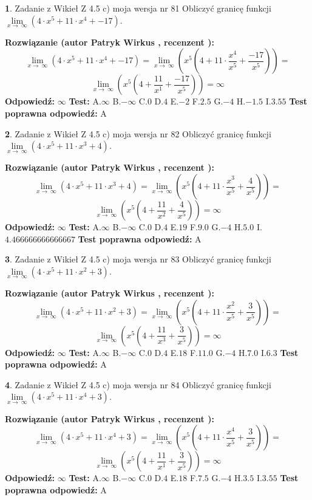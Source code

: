 \documentclass[12pt, a4paper]{article}
\theoremstyle{definition} %
\newtheorem{zad}{}
\newcommand{\zadStart}[1]{\begin{zad}#1\newline}
\newcommand{\zadStop}{\end{zad}}
\newcommand{\rozwStart}[2]{\noindent \textbf{Rozwiązanie (autor #1 , recenzent #2): }\newline}
\newcommand{\rozwStop}{\newline}
\newcommand{\odpStart}{\noindent \textbf{Odpowiedź:}\newline}
\newcommand{\odpStop}{\newline}
\newcommand{\testStart}{\noindent \textbf{Test:}\newline}
\newcommand{\testStop}{\newline}
\newcommand{\kluczStart}{\noindent \textbf{Test poprawna odpowiedź:}\newline}
\newcommand{\kluczStop}{\newline}
\begin{document}
\zadStart{Zadanie z Wikieł Z 4.5 c) moja wersja nr 81}
Obliczyć granicę funkcji  $\lim\limits_{x\to\ \infty}(4 \cdot x^{5}+11 \cdot x^{4}+-17)$.
\zadStop
\rozwStart{Patryk Wirkus}{}
$$\lim\limits_{x\to\ \infty}(4 \cdot x^{5}+11 \cdot x^{4}+-17) = \lim\limits_{x\to\ \infty}(x^{5}(4 +11 \cdot \frac{x^{4}}{x^{5}}+\frac{-17}{x^{5}})) =$$ $$\lim\limits_{x\to\ \infty}(x^{5}(4 +\frac{11}{x^{1}}+\frac{-17}{x^{5}})) =\infty$$
\rozwStop
\odpStart
$\infty$
\odpStop
\testStart
A.$\infty$ B.$-\infty$ C.$0$ D.$4$ E.$-2$
F.$2.5$ G.$-4$
H.$-1.5$
I.$3.55$
\testStop
\kluczStart
A
\kluczStop



\zadStart{Zadanie z Wikieł Z 4.5 c) moja wersja nr 82}
Obliczyć granicę funkcji  $\lim\limits_{x\to\ \infty}(4 \cdot x^{5}+11 \cdot x^{3}+4)$.
\zadStop
\rozwStart{Patryk Wirkus}{}
$$\lim\limits_{x\to\ \infty}(4 \cdot x^{5}+11 \cdot x^{3}+4) = \lim\limits_{x\to\ \infty}(x^{5}(4 +11 \cdot \frac{x^{3}}{x^{5}}+\frac{4}{x^{5}})) =$$ $$\lim\limits_{x\to\ \infty}(x^{5}(4 +\frac{11}{x^{2}}+\frac{4}{x^{5}})) =\infty$$
\rozwStop
\odpStart
$\infty$
\odpStop
\testStart
A.$\infty$ B.$-\infty$ C.$0$ D.$4$ E.$19$
F.$9.0$ G.$-4$
H.$5.0$
I.$4.466666666666667$
\testStop
\kluczStart
A
\kluczStop



\zadStart{Zadanie z Wikieł Z 4.5 c) moja wersja nr 83}
Obliczyć granicę funkcji  $\lim\limits_{x\to\ \infty}(4 \cdot x^{5}+11 \cdot x^{2}+3)$.
\zadStop
\rozwStart{Patryk Wirkus}{}
$$\lim\limits_{x\to\ \infty}(4 \cdot x^{5}+11 \cdot x^{2}+3) = \lim\limits_{x\to\ \infty}(x^{5}(4 +11 \cdot \frac{x^{2}}{x^{5}}+\frac{3}{x^{5}})) =$$ $$\lim\limits_{x\to\ \infty}(x^{5}(4 +\frac{11}{x^{3}}+\frac{3}{x^{5}})) =\infty$$
\rozwStop
\odpStart
$\infty$
\odpStop
\testStart
A.$\infty$ B.$-\infty$ C.$0$ D.$4$ E.$18$
F.$11.0$ G.$-4$
H.$7.0$
I.$6.3$
\testStop
\kluczStart
A
\kluczStop



\zadStart{Zadanie z Wikieł Z 4.5 c) moja wersja nr 84}
Obliczyć granicę funkcji  $\lim\limits_{x\to\ \infty}(4 \cdot x^{5}+11 \cdot x^{4}+3)$.
\zadStop
\rozwStart{Patryk Wirkus}{}
$$\lim\limits_{x\to\ \infty}(4 \cdot x^{5}+11 \cdot x^{4}+3) = \lim\limits_{x\to\ \infty}(x^{5}(4 +11 \cdot \frac{x^{4}}{x^{5}}+\frac{3}{x^{5}})) =$$ $$\lim\limits_{x\to\ \infty}(x^{5}(4 +\frac{11}{x^{1}}+\frac{3}{x^{5}})) =\infty$$
\rozwStop
\odpStart
$\infty$
\odpStop
\testStart
A.$\infty$ B.$-\infty$ C.$0$ D.$4$ E.$18$
F.$7.5$ G.$-4$
H.$3.5$
I.$3.55$
\testStop
\kluczStart
A
\kluczStop
\end{document}
